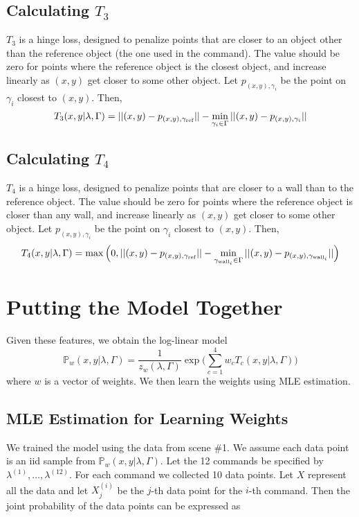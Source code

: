 \documentclass[12pt,letterpaper]{article}
\newcommand\refobj{\textmd{ref}}
\newcommand\prob{\mathbb{P}}
\begin{document}
\subsection{Calculating $T_3$}
$T_3$ is a hinge loss, designed to penalize points that are closer to an object other than the reference object (the one used in the command). The value should be zero for points where the reference object is the closest object, and increase linearly as $(x, y)$ get closer to some other object. Let $p_{(x, y), \gamma_i}$ be the point on $\gamma_i$ closest to $(x, y)$. Then,
\[
T_3(x, y|\lambda, \Gamma) = ||(x, y) - p_{(x, y), \gamma_{\refobj}}|| - \min_{\gamma_i \in \Gamma} ||(x, y) - p_{(x, y), \gamma_i}||
\]

\subsection{Calculating $T_4$}
$T_4$ is a hinge loss, designed to penalize points that are closer to a wall than to the reference object. The value should be zero for points where the reference object is closer than any wall, and increase linearly as $(x, y)$ get closer to some other object. Let $p_{(x, y), \gamma_i}$ be the point on $\gamma_i$ closest to $(x, y)$. Then,
\[
T_4(x, y|\lambda, \Gamma) = \max\Big(0, ||(x, y) - p_{(x, y), \gamma_{\refobj}}|| - \min_{\gamma_{\textmd{wall}_i} \in \Gamma} ||(x, y) - p_{(x, y), \gamma_{\textmd{wall}_i}}||\Big)
\]
\section*{Putting the Model Together}
Given these features, we obtain the log-linear model
\[
\mathbb{P}_w(x, y|\lambda, \Gamma) = \frac{1}{z_w(\lambda, \Gamma)}\exp\bigg(\sum_{c = 1}^4w_cT_c(x, y|\lambda, \Gamma)\bigg)
\]
where $w$ is a vector of weights. We then learn the weights using MLE estimation.

\subsection{MLE Estimation for Learning Weights}
We trained the model using the data from scene \#1. We assume each data point is an iid sample from $\prob_w(x, y|\lambda, \Gamma)$. Let the 12 commands be specified by $\lambda^{(1)}, \ldots, \lambda^{(12)}$. For each command we collected 10 data points. Let $X$ represent all the data and let $X^{(i)}_j$ be the $j$-th data point for the $i$-th command. Then the joint probability of the data points can be expressed as
\end{document}
